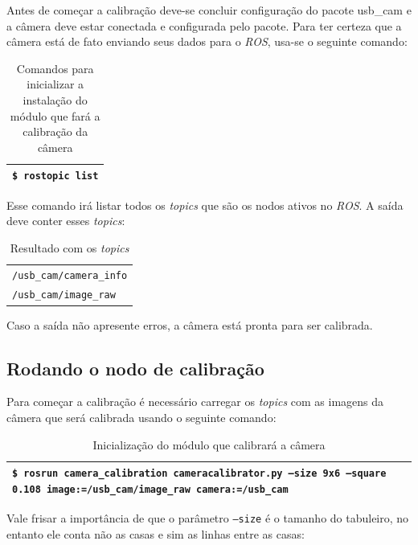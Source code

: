 Antes de começar a calibração deve-se concluir configuração do pacote usb\_cam e a câmera deve estar conectada e configurada pelo pacote. Para ter certeza que a câmera está de fato enviando seus dados para o \textit{ROS}, usa-se o seguinte comando:

\begin{table}[H]\label{tb:2}
\begin{tabular}{| p{\textwidth}|}
\hline
\texttt{\$ rostopic list}\\
\hline
\end{tabular}
\caption{Comandos para inicializar a instalação do módulo que fará a calibração da câmera}
\end{table}

Esse comando irá listar todos os \textit{topics} que são os nodos ativos no \textit{ROS}. A saída deve conter esses \textit{topics}:

\begin{table}[H]\label{tb:3}
\begin{tabular}{| p{\textwidth}|}
\hline
\texttt{/usb\_cam/camera\_info} \\
\texttt{/usb\_cam/image\_raw}\\
\hline
\end{tabular}
\caption{Resultado com os \textit{topics}}
\end{table}

Caso a saída não apresente erros, a câmera está pronta para ser calibrada.

\subsection{Rodando o nodo de calibração}

Para começar a calibração é necessário carregar os \textit{topics} com as imagens da câmera que será calibrada usando o seguinte comando:

\begin{table}[H]\label{tb:4}
\begin{tabular}{| p{\textwidth}|}
\hline
\texttt{\$ rosrun camera\_calibration cameracalibrator.py --size 9x6 --square 0.108 image:=/usb\_cam/image\_raw camera:=/usb\_cam}\\
\hline
\end{tabular}
\caption{Inicialização do módulo que calibrará a câmera}
\end{table}

Vale frisar a importância de que o parâmetro \texttt{--size} é o tamanho do tabuleiro, no entanto ele conta não as casas e sim as linhas entre as casas:

